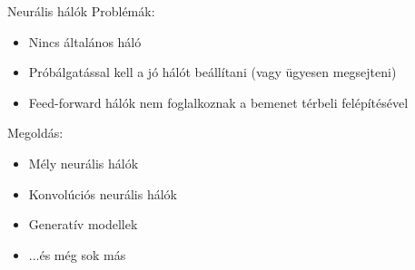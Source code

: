 \begin{frame}{Neurális hálók}
    Problémák:
    \begin{itemize}
        \item Nincs általános háló
        \item Próbálgatással kell a jó hálót beállítani (vagy ügyesen megsejteni)
        \item Feed-forward hálók nem foglalkoznak a bemenet térbeli felépítésével
    \end{itemize}
    
    Megoldás: 
    \begin{itemize}
        \item Mély neurális hálók
        \item Konvolúciós neurális hálók
        \item Generatív modellek
        \item ...és még sok más
    \end{itemize}
\end{frame}